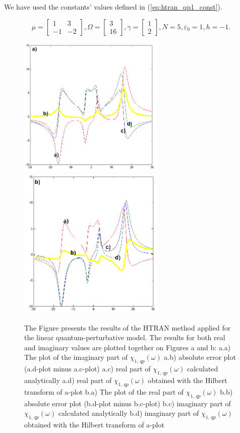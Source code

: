 \documentclass[12pt,twoside,a4paper]{article}
\numberwithin{equation}{subsection}
\numberwithin{figure}{subsection}
\begin{document}
We have used the constants' values defined in (\ref{eq:htran_qp1_const}). 

\begin{equation} \label{eq:htran_qp1_const}
  \mu = \begin{bmatrix} 
          1  & 3 \\ 
          -1 & -2
        \end{bmatrix},
  \Omega = \begin{bmatrix}
           3 \\ 16
           \end{bmatrix},
  \gamma = \begin{bmatrix}
           1 \\ 2
           \end{bmatrix}, 
  N = 5, 
  \varepsilon_0 = 1, 
  h = -1.
\end{equation}

\begin{figure} 
  \includegraphics[width=70mm]{img/htran_qp_2da.png} 
  \includegraphics[width=70mm]{img/htran_qp_2db.png}  
  \caption{The Figure presents the results of the HTRAN method applied for the linear quantum-perturbative model. The results for both real and imaginary values are plotted together on Figures a and b:
  a.a) The plot of the imaginary part of ${\chi_{1, \, qp}}(\omega )$ 
  a.b) absolute error plot (a.d-plot minus a.c-plot) 
  a.c) real part of ${\chi_{1, \, qp}}(\omega )$ calculated analytically
  a.d) real part of ${\chi_{1, \, qp}}(\omega )$ obtained with the Hilbert transform of a-plot
  b.a) The plot of the real part of ${\chi_{1, \, qp}}(\omega )$
  b.b) absolute error plot (b.d-plot minus b.c-plot)  
  b.c) imaginary part of ${\chi_{1, \, qp}}(\omega )$ calculated analytically 
  b.d) imaginary part of ${\chi_{1, \, qp}}(\omega )$ obtained with the Hilbert transform of a-plot 
  \label{fig:htran_qp_2d}}
\end{figure}
\end{document}
